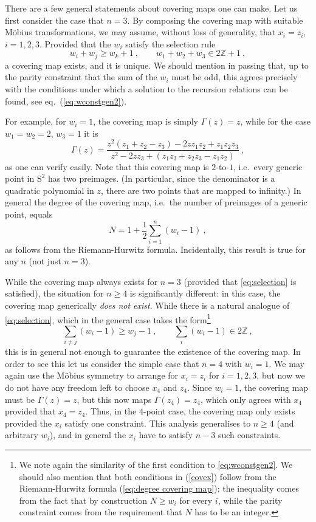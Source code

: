 \documentclass[12pt,a4paper]{article}
\newcommand{\be}{\begin{equation}}
\newcommand{\ee}{\end{equation}}
\begin{document}
There are a few general statements about covering maps one can make. Let us first consider the case that $n=3$. By composing the covering map with suitable M\"obius transformations, we may assume, without loss of generality, that $x_i=z_i$, $i=1,2,3$. Provided that the $w_i$ satisfy the selection rule 
\be\label{eq:selection}
w_i + w_j \geq w_k  +1 \ , \qquad w_1 + w_2 + w_3 \in 2 \mathds{Z}+1\ ,
\ee
a covering map exists, and it is unique. We should mention in passing that, up to the parity constraint that the sum of the $w_i$ must be odd, this agrees precisely with the conditions under which a solution to the recursion relations can be found, see eq.~(\ref{eq:wconstgen2}). 

For example, for $w_i=1$, the covering map is simply $\Gamma(z)=z$, while for the case $w_1=w_2=2$, $w_3=1$ it is 
\be
\Gamma(z) = \frac{z^2 ( z_1 + z_2 - z_3) - 2 z z_1 z_2 + z_1 z_2 z_3}{ z^2 - 2 z z_3 +(z_1 z_3 +z_2 z_3 - z_1z_2)} \ , 
\ee
as one can verify easily. Note that this covering map is $2$-to-$1$, i.e.\ every generic point in $\mathrm{S}^2$ has two preimages. (In particular, since the denominator is a quadratic polynomial in $z$, there are two points that are mapped to infinity.) In general the degree of the covering map, i.e.\ the number of preimages of a generic point, equals 
\be
N = 1 + \frac{1}{2} \sum_{i=1}^{n} (w_i - 1) \ , \label{eq:degree covering map}
\ee
as follows from the Riemann-Hurwitz formula. Incidentally, this result is true for any $n$ (not just $n=3$). 
\smallskip

While the covering map always exists for $n=3$ (provided that \eqref{eq:selection} is satisfied), the situation for $n\geq 4$ is significantly different: in this case, the covering map generically \emph{does not exist}. While there is a natural analogue of \eqref{eq:selection}, which in the general case takes the form\footnote{We note again the similarity of the first condition to \eqref{eq:wconstgen2}. We should also mention that both conditions in (\ref{covex}) follow from the Riemann-Hurwitz formula (\ref{eq:degree covering map}): the inequality comes from the fact that by construction $N\geq w_i$ for every $i$, while the parity constraint comes from the requirement that $N$ has to be an integer.}
\be\label{covex}
\sum_{i\neq j} (w_i-1) \geq w_j-1 \ , \qquad \sum_{i} (w_i-1) \in 2 \mathds{Z} \ ,
\ee
this is in general not enough to guarantee the existence of the covering map. In order to see this let us consider the simple case that $n=4$ with $w_i=1$. We may again use the M\"obius symmetry to arrange for $x_i=z_i$ for $i=1,2,3$, but now we do not have any freedom left to choose $x_4$ and $z_4$. Since $w_i=1$, the covering map must be $\Gamma(z)=z$, but this now maps $\Gamma(z_4)=z_4$, which only agrees with $x_4$ provided that $x_4=z_4$. Thus, in the $4$-point case, the covering map only exists provided the $x_i$ satisfy one constraint. This analysis generalises to $n\geq 4$ (and arbitrary $w_i$), and in general the $x_i$ have to satisfy $n-3$ such constraints. 
\end{document}
